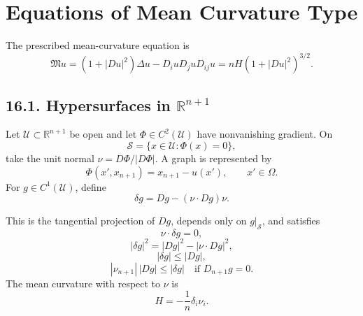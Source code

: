 \chapter{Equations of Mean Curvature Type}

The prescribed mean-curvature equation is
\begin{equation}
\mathfrak Mu=(1+|Du|^2)\Delta u-D_iuD_juD_{ij}u
=nH(1+|Du|^2)^{3/2}.
\tag{16.1}
\end{equation}


\section*{16.1. Hypersurfaces in $\mathbb R^{n+1}$}

\begin{definition}\label{gilbarg-trudinger.def.tangential-gradient}
Let $\mathcal U\subset\mathbb R^{n+1}$ be open and let
$\Phi\in C^2(\mathcal U)$ have nonvanishing gradient.  On
\begin{equation}
\mathcal S=\{x\in\mathcal U:\Phi(x)=0\},
\tag{16.2}
\end{equation}
take the unit normal $\nu=D\Phi/|D\Phi|$.  A graph is represented by
\begin{equation}
\Phi(x',x_{n+1})=x_{n+1}-u(x'),
\qquad x'\in\Omega.
\tag{16.3}
\end{equation}
For $g\in C^1(\mathcal U)$, define
\begin{equation}
\delta g=Dg-(\nu\cdot Dg)\nu.
\tag{16.4}
\end{equation}
\end{definition}

This is the tangential projection of $Dg$, depends only on
$g|_{\mathcal S}$, and satisfies
\begin{equation}
\nu\cdot\delta g=0,
\tag{16.5}
\end{equation}
\begin{equation}
|\delta g|^2=|Dg|^2-|\nu\cdot Dg|^2,
\tag{16.6}
\end{equation}
\begin{equation}
|\delta g|\le|Dg|,
\tag{16.7}
\end{equation}
\begin{equation}
|\nu_{n+1}|\,|Dg|\le|\delta g|
\quad\text{if }D_{n+1}g=0.
\tag{16.8}
\end{equation}
The mean curvature with respect to $\nu$ is
\begin{equation}
H=-\frac1n\delta_i\nu_i.
\tag{16.9}
\end{equation}


